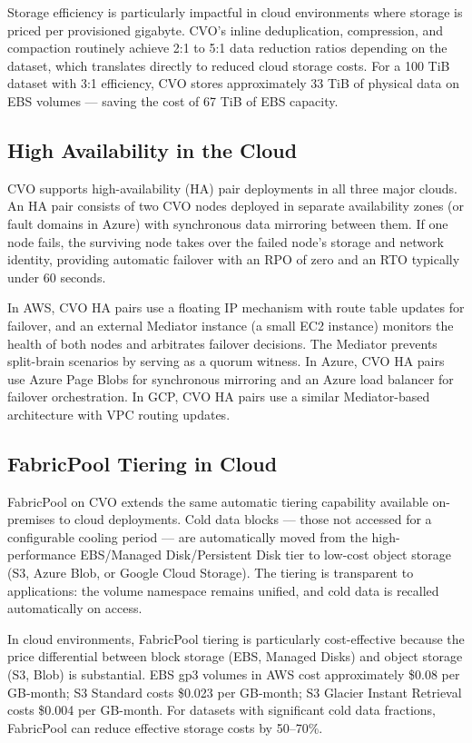 Storage efficiency is particularly impactful in cloud environments where storage is priced per provisioned gigabyte. CVO's inline deduplication, compression, and compaction routinely achieve 2:1 to 5:1 data reduction ratios depending on the dataset, which translates directly to reduced cloud storage costs. For a 100 TiB dataset with 3:1 efficiency, CVO stores approximately 33 TiB of physical data on EBS volumes --- saving the cost of 67 TiB of EBS capacity.

\subsection{High Availability in the Cloud}

CVO supports high-availability (HA) pair deployments in all three major clouds. An HA pair consists of two CVO nodes deployed in separate availability zones (or fault domains in Azure) with synchronous data mirroring between them. If one node fails, the surviving node takes over the failed node's storage and network identity, providing automatic failover with an RPO of zero and an RTO typically under 60 seconds.

In AWS, CVO HA pairs use a floating IP mechanism with route table updates for failover, and an external Mediator instance (a small EC2 instance) monitors the health of both nodes and arbitrates failover decisions. The Mediator prevents split-brain scenarios by serving as a quorum witness. In Azure, CVO HA pairs use Azure Page Blobs for synchronous mirroring and an Azure load balancer for failover orchestration. In GCP, CVO HA pairs use a similar Mediator-based architecture with VPC routing updates.

\subsection{FabricPool Tiering in Cloud}

FabricPool on CVO extends the same automatic tiering capability available on-premises to cloud deployments. Cold data blocks --- those not accessed for a configurable cooling period --- are automatically moved from the high-performance EBS/Managed Disk/Persistent Disk tier to low-cost object storage (S3, Azure Blob, or Google Cloud Storage). The tiering is transparent to applications: the volume namespace remains unified, and cold data is recalled automatically on access.

In cloud environments, FabricPool tiering is particularly cost-effective because the price differential between block storage (EBS, Managed Disks) and object storage (S3, Blob) is substantial. EBS gp3 volumes in AWS cost approximately \$0.08 per GB-month; S3 Standard costs \$0.023 per GB-month; S3 Glacier Instant Retrieval costs \$0.004 per GB-month. For datasets with significant cold data fractions, FabricPool can reduce effective storage costs by 50--70\%.

